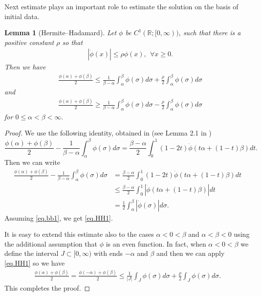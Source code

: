 \documentclass[reqno]{amsart}
\newtheorem{Lemma}[Theorem]{Lemma}
\begin{document}
Next estimate plays an important role
to estimate the solution on the basis of initial data.

\begin{Lemma}[Hermite–Hadamard]\label{l3}
Let $\phi$ be $C^1(\mathbb R; [0,\infty))$,
such that there is a positive constant $\rho$ so that
\begin{align}\label{eq.bb1}
 &  |\dot \phi(x)| \leq \rho  \phi(x) , \ \ \forall x \geq 0.
\end{align}
Then we have
\begin{align}\label{eq.HH1}
      & \frac{ \phi(\alpha) + \phi(\beta)}{2} \leq  \frac{1}{\beta - \alpha} \int_{\alpha}^{\beta} \phi(\sigma) d \sigma + \frac{\rho}{2} \int_{\alpha}^\beta \phi(\sigma) d \sigma
\end{align}
and
\begin{align}\label{eq.HH1mm}
      & \frac{ \phi(\alpha) + \phi(\beta)}{2} \geq  \frac{1}{\beta - \alpha} \int_{\alpha}^{\beta} \phi(\sigma) d \sigma -\frac{\rho}{2} \int_{\alpha}^\beta \phi(\sigma) d \sigma
\end{align}
for $0  \leq  \alpha < \beta < \infty.$
\end{Lemma}

\begin{proof}
We use the following identity, obtained in \cite{DA98}
(see Lemma 2.1 in \cite{DA98})
	\[
	\frac{ \phi(\alpha) + \phi(\beta)}{2} - \frac{1}{\beta - \alpha} \int_{\alpha}^{\beta} \phi(\sigma) d \sigma
	= \frac{\beta -  \alpha}{2} \int_0^1 (1-2t) \dot \phi(t \alpha + (1-t)\beta) dt.
	\]
Then we can write
	\begin{align*}
	\frac{ \phi(\alpha) + \phi(\beta)}{2} - \frac{1}{\beta - \alpha} \int_{\alpha}^{\beta} \phi(\sigma) d \sigma
	& = \frac{\beta - \alpha}{2} \int_0^1 (1-2t) \dot \phi(t \alpha + (1-t)\beta) dt \\
	& \leq \frac{\beta - \alpha}{2} \int_{0}^1  | \dot \phi(t \alpha + (1-t)\beta)| dt \\
	&  = \frac{1}{2}\int_{\alpha}^{\beta} |\dot \phi(\sigma)| d \sigma.
	\end{align*}
Assuming \eqref{eq.bb1}, we get
\eqref{eq.HH1}.

It is easy to extend this estimate also to the cases $\alpha < 0 < \beta$ and $\alpha < \beta <0$
using the additional assumption that $\phi$ is an even function.
In fact, when $\alpha < 0 < \beta$ we define the interval $J\subset [0,\infty)$ with ends $-\alpha$ and $\beta$ and then we can apply \eqref{eq.HH1} so we have
	\begin{align}\label{eq.HH1m}
	\frac{ \phi(\alpha) + \phi(\beta)}{2}
	= \frac{ \phi(-\alpha) + \phi(\beta)}{2}
	\leq  \frac{1}{|J|} \int_{J} \phi(\sigma) d \sigma
	+ \frac{\rho}{2} \int_{J } \phi(\sigma) d \sigma.
	\end{align}
This completes the proof.
\end{proof}
\end{document}
